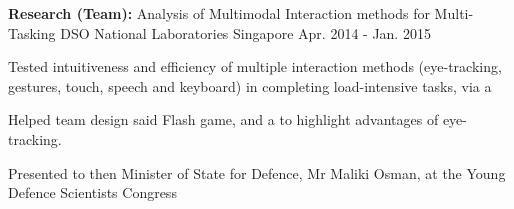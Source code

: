 \begin{cventries}
\cventry
{\textbf{Research (Team):} Analysis of Multimodal Interaction methods for Multi-Tasking 
} %
{DSO National Laboratories} %
{Singapore} %
{Apr. 2014 - Jan. 2015} %
{ %
	\begin{cvitems}
		\item { Tested intuitiveness and efficiency of multiple interaction methods (eye-tracking, gestures, touch, speech and keyboard) in completing load-intensive tasks, via a }
		\item { Helped team design said Flash game, and a  to highlight advantages of eye-tracking. }
		\item { Presented to then Minister of State for Defence, Mr Maliki Osman, at the Young Defence Scientists Congress }
	\end{cvitems}
}


\end{cventries}